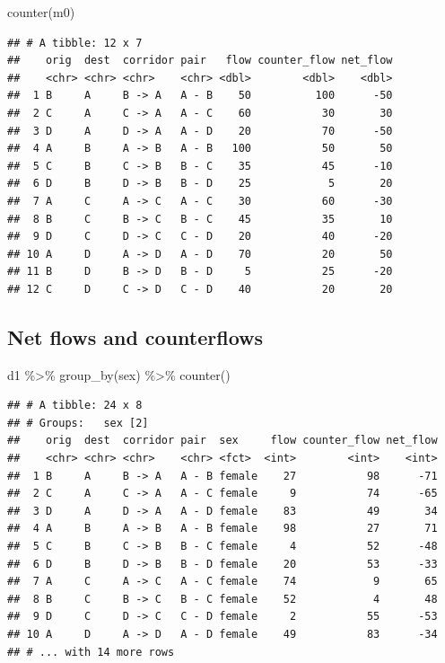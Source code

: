 \documentclass[
]{book}
\newenvironment{Shaded}{\begin{snugshade}}{\end{snugshade}}
\newcommand{\FunctionTok}[1]{\textcolor[rgb]{0.00,0.00,0.00}{#1}}
\newcommand{\NormalTok}[1]{#1}
\newcommand{\SpecialCharTok}[1]{\textcolor[rgb]{0.00,0.00,0.00}{#1}}
\begin{document}
\begin{Shaded}
\begin{Highlighting}[]
\FunctionTok{counter}\NormalTok{(m0)}
\end{Highlighting}
\end{Shaded}

\begin{verbatim}
## # A tibble: 12 x 7
##    orig  dest  corridor pair   flow counter_flow net_flow
##    <chr> <chr> <chr>    <chr> <dbl>        <dbl>    <dbl>
##  1 B     A     B -> A   A - B    50          100      -50
##  2 C     A     C -> A   A - C    60           30       30
##  3 D     A     D -> A   A - D    20           70      -50
##  4 A     B     A -> B   A - B   100           50       50
##  5 C     B     C -> B   B - C    35           45      -10
##  6 D     B     D -> B   B - D    25            5       20
##  7 A     C     A -> C   A - C    30           60      -30
##  8 B     C     B -> C   B - C    45           35       10
##  9 D     C     D -> C   C - D    20           40      -20
## 10 A     D     A -> D   A - D    70           20       50
## 11 B     D     B -> D   B - D     5           25      -20
## 12 C     D     C -> D   C - D    40           20       20
\end{verbatim}

\hypertarget{net-flows-and-counterflows-1}{%
\subsection{Net flows and counterflows}\label{net-flows-and-counterflows-1}}

\begin{Shaded}
\begin{Highlighting}[]
\NormalTok{d1 }\SpecialCharTok{\%\textgreater{}\%}
  \FunctionTok{group\_by}\NormalTok{(sex) }\SpecialCharTok{\%\textgreater{}\%}
  \FunctionTok{counter}\NormalTok{()}
\end{Highlighting}
\end{Shaded}

\begin{verbatim}
## # A tibble: 24 x 8
## # Groups:   sex [2]
##    orig  dest  corridor pair  sex     flow counter_flow net_flow
##    <chr> <chr> <chr>    <chr> <fct>  <int>        <int>    <int>
##  1 B     A     B -> A   A - B female    27           98      -71
##  2 C     A     C -> A   A - C female     9           74      -65
##  3 D     A     D -> A   A - D female    83           49       34
##  4 A     B     A -> B   A - B female    98           27       71
##  5 C     B     C -> B   B - C female     4           52      -48
##  6 D     B     D -> B   B - D female    20           53      -33
##  7 A     C     A -> C   A - C female    74            9       65
##  8 B     C     B -> C   B - C female    52            4       48
##  9 D     C     D -> C   C - D female     2           55      -53
## 10 A     D     A -> D   A - D female    49           83      -34
## # ... with 14 more rows
\end{verbatim}
\end{document}
